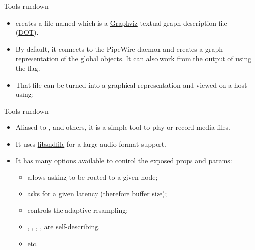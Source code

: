 \begin{frame}{Tools rundown — }
  \begin{itemize}

  \item {} creates a file named  which is a
    \href{https://graphviz.org/}{Graphviz} textual graph description
    file (\href{
    https://en.wikipedia.org/wiki/DOT_(graph_description_language)}{DOT}).

  \item By default, it connects to the PipeWire daemon and creates a
    graph representation of the global objects. It can also work from
    the output of  using the  flag.

  \item That file can be turned into a graphical representation and
    viewed on a host using:\\

  \end{itemize}
\end{frame}



\begin{frame}{Tools rundown — }
  \begin{itemize}

  \item Aliased to ,  and others, it is a
    simple tool to play or record media files.

  \item It uses \href{https://libsndfile.github.io/libsndfile/
    }{libsndfile} for a large audio format support.

  \item It has many options available to control the exposed props and
    params:

    \begin{itemize}
    \item {} allows asking to be routed to a given node;
    \item {} asks for a given latency (therefore buffer size);
    \item {} controls the adaptive resampling;
    \item {}, , ,
      ,  are self-describing.
    \item etc.
    \end{itemize}

  \end{itemize}
\end{frame}



